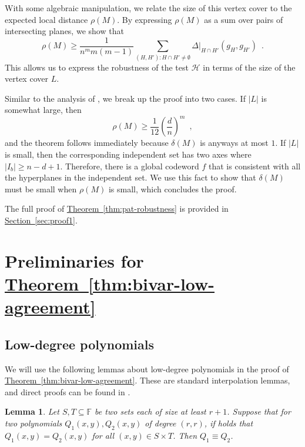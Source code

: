 \documentclass[11pt]{article}
\numberwithin{equation}{section}
\newtheorem{lemma}[theorem]{Lemma}
\theoremstyle{definition}
\theoremstyle{plain}
\newcommand{\expref}[2]{\hyperref[#2]{#1~\ref{#2}}}
\theoremstyle{plain}
\newcommand{\colored}{}
\newcommand{\reldist}{\colored{\delta}}
\newcommand{\robust}{\colored{\rho}} %
\newcommand{\tester}{\colored{\mathcal H}} %
\newcommand{\plane}{{\colored{H}}} %
\newcommand{\otherplane}{\colored{ {H'}}} %
\newcommand{\hamdist}{\colored{\Delta}} %
\newcommand{\codedist}{\colored{d}} %
\newcommand{\blocklength}{\colored{n}} %
\newcommand{\testerinput}{\colored{M}} %
\newcommand{\closestlocalword}[1]{ \colored{g_{#1}}} %
\newcommand{\closestglobalword}{\colored{f}} %
\newcommand{\Field}{\colored{\mathbb F}}
\newcommand{\degree}{\colored{r}}
\newcommand\abs[1]{\colored{\left|#1\right|}}
\begin{document}
With some algebraic manipulation, we relate the size of this vertex cover to the expected local distance $\robust(\testerinput)$. By expressing $\robust(\testerinput)$ as a sum over pairs of intersecting planes, we show that
\begin{equation*}
\robust(\testerinput) \geq  \frac{1}{\blocklength^{m} m(m-1)} \sum_{(\plane, \otherplane) : \plane \cap \otherplane \ne \emptyset} \hamdist \vert_{\plane \cap \otherplane} (\closestlocalword{\plane}, \closestlocalword{\otherplane}) \enspace.
\end{equation*}
This allows us to express the robustness of the test $\tester$ in terms of the size of the vertex cover $L$.

Similar to the analysis of \cite{Viderman12}, we break up the proof into two cases. If $\abs{L}$ is somewhat large,
then
\[
  \rho(M) \geq \frac{1}{12} \left(\frac{\codedist}{\blocklength}\right)^m\enspace,
\]
and the theorem follows immediately because $\reldist(\testerinput)$
is anyways at most $1$. If $\abs{L}$ is small, then the corresponding
independent set has two axes where
$\abs{I_b} \geq \blocklength - \codedist + 1$. Therefore, there is a
global codeword $\closestglobalword$ that is consistent with all the
hyperplanes in the independent set. We use this fact to show that
$\reldist(\testerinput)$ must be small when $\robust(\testerinput)$ is
small, which concludes the proof.

The full proof of \expref{Theorem}{thm:pat-robustness} is provided in \expref{Section}{sec:proof1}.

%
%
\section{Preliminaries for \expref{Theorem}{thm:bivar-low-agreement}}
\label{sec:prelim-bivar}
\subsection{Low-degree polynomials}
We will use the following lemmas about low-degree polynomials in the proof of \expref{Theorem}{thm:bivar-low-agreement}. These are standard interpolation lemmas, and direct proofs can be found in \cite{PolishchukS94}.

\begin{lemma}\label{lemma:zero poly}
    Let $S,T \subseteq \Field$ be two sets each of size at least $\degree+1$.
    Suppose that for two polynomials $Q_1(x,y), Q_2(x,y)$ of degree $(\degree,\degree)$,
    if holds that $Q_1(x,y) = Q_2(x,y)$ for all $(x,y) \in S \times T$.
    Then $Q_1 \equiv Q_2$.
\end{lemma}
\end{document}
